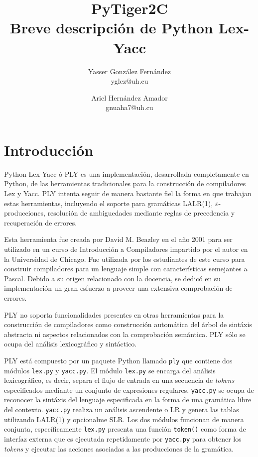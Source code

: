 \documentclass{article}
\title{
	\LARGE{PyTiger2C} \\
	\Large{Breve descripción de Python Lex-Yacc}
}
\author{
  	Yasser González Fernández \\
  	\small{yglez@uh.cu}
  	\and
  	Ariel Hernández Amador \\
  	\small{gnuaha7@uh.cu}
}
\date{}
\begin{document}
\maketitle

\thispagestyle{empty}

\newpage

\setcounter{page}{1}

\section{Introducción}

Python Lex-Yacc ó PLY es una implementación, desarrollada completamente en
Python, de las herramientas tradicionales para la construcción de compiladores
Lex y Yacc. PLY intenta seguir de manera bastante fiel la forma en que
trabajan estas herramientas, incluyendo el soporte para gramáticas LALR(1),
$\varepsilon$-producciones, resolución de ambiguedades mediante reglas de
precedencia y recuperación de errores.

Esta herramienta fue creada por David M. Beazley en el año 2001 para ser
utilizado en un curso de Introducción a Compiladores impartido por el autor en
la Universidad de Chicago. Fue utilizada por los estudiantes de este curso
para construir compiladores para un lenguaje simple con características
semejantes a Pascal. Debido a su origen relacionado con la docencia, se dedicó
en su implementación un gran esfuerzo a proveer una extensiva comprobación de
errores.

PLY no soporta funcionalidades presentes en otras herramientas para la
construcción de compiladores como construcción automática del árbol de sintáxis
abstracta ni aspectos relacionados con la comprobación semántica. PLY sólo se
ocupa del análisis lexicográfico y sintáctico.

PLY está compuesto por un paquete Python llamado \texttt{ply} que contiene
dos módulos \texttt{lex.py} y \texttt{yacc.py}. El módulo \texttt{lex.py} se
encarga del análisis lexicográfico, es decir, separa el flujo de entrada en una
secuencia de \textit{tokens} especificados mediante un conjunto de expresiones
regulares. \texttt{yacc.py} se ocupa de reconocer la sintáxis del lenguaje
especificada en la forma de una gramática libre del contexto. \texttt{yacc.py}
realiza un análisis ascendente o LR y genera las tablas utilizando LALR(1) y
opcionalme SLR. Los dos módulos funcionan de manera conjunta, específicamente
\texttt{lex.py} presenta una función \texttt{token()} como forma de interfaz
externa que es  ejecutada repetidamente por \texttt{yacc.py} para obtener los
\textit{tokens} y  ejecutar las acciones asociadas a las producciones de la
gramática.
\end{document}
